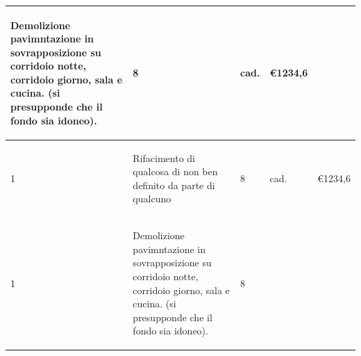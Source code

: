 \documentclass[a4paper]{article}
\begin{document}
\begin{tabular}{ | L{10mm} |  L{86mm} | L{12mm} | L{12mm} | L{16mm} | }
\begin{spacing}{0}
  Demolizione pavimntazione in sovrapposizione su corridoio
notte, corridoio giorno, sala e cucina. (si presupponde
che il fondo sia idoneo).
  \end{spacing} &
  \vspace{2.5mm}
  \begin{spacing}{0}
    8
  \end{spacing} &
  \vspace{2.5mm}
  \begin{spacing}{0}
    cad.
  \end{spacing} &
  \vspace{2.5mm}
  \begin{spacing}{0}
    \euro\hfill 1234,6
  \end{spacing} \\
  \hline
  \vspace{2.5mm}
  \begin{spacing}{0}
    1
  \end{spacing} &
  \vspace{2.5mm}
  \begin{spacing}{0}
    Rifacimento di qualcosa di non ben definito da parte di qualcuno
  \end{spacing} &
  \vspace{2.5mm}
  \begin{spacing}{0}
    8
  \end{spacing} &
  \vspace{2.5mm}
  \begin{spacing}{0}
    cad.
  \end{spacing} &
  \vspace{2.5mm}
  \begin{spacing}{0}
    \euro\hfill 1234,6
  \end{spacing} \\
  \hline
  \vspace{2.5mm}
  \begin{spacing}{0}
    1
  \end{spacing} &
  \vspace{2.5mm}
  \begin{spacing}{0}
  Demolizione pavimntazione in sovrapposizione su corridoio
notte, corridoio giorno, sala e cucina. (si presupponde
che il fondo sia idoneo).
  \end{spacing} &
  \vspace{2.5mm}
  \begin{spacing}{0}
    8
  \end{spacing} &
  \vspace{2.5mm}

\end{tabular}
\end{document}
